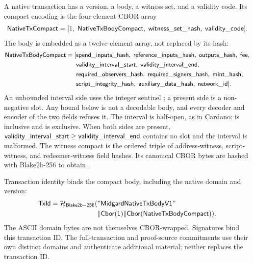 \documentclass[../midgard.tex]{subfiles}
\begin{document}
A native transaction has a version, a body, a witness set, and a validity code.
Its compact encoding is the four-element CBOR array
\begin{equation*}
  \mathsf{NativeTxCompact} =
  [1,\; \mathsf{NativeTxBodyCompact},\; \mathsf{witness\_set\_hash},\; \mathsf{validity\_code}].
\end{equation*}
The body is embedded as a twelve-element array, not replaced by its hash:
\begin{equation*}
\small
\begin{split}
\mathsf{NativeTxBodyCompact} = [&
\mathsf{spend\_inputs\_hash},\;
\mathsf{reference\_inputs\_hash},\;
\mathsf{outputs\_hash},\;
\mathsf{fee},\\
&\mathsf{validity\_interval\_start},\;
\mathsf{validity\_interval\_end},\\
&\mathsf{required\_observers\_hash},\;
\mathsf{required\_signers\_hash},\;
\mathsf{mint\_hash},\\
&\mathsf{script\_integrity\_hash},\;
\mathsf{auxiliary\_data\_hash},\;
\mathsf{network\_id}].
\end{split}
\end{equation*}
An unbounded interval side uses the integer sentinel ; a present side is a non-negative slot.
Any bound below  is not a decodable body, and every decoder and encoder of the two fields refuses it.
The interval is half-open, as in Cardano:  is inclusive and  is exclusive.
When both sides are present, $\mathsf{validity\_interval\_start} \ge \mathsf{validity\_interval\_end}$ contains no slot and the interval is malformed.
The witness compact is the ordered triple of address-witness, script-witness, and redeemer-witness field hashes.
Its canonical CBOR bytes are hashed with Blake2b-256 to obtain .

Transaction identity binds the compact body, including the native domain and version:
\begin{equation*}
\begin{split}
\mathsf{TxId}=\mathcal{H}_{\mathsf{Blake2b-256}}(&
\mathsf{"MidgardNativeTxBodyV1"}\\
&\Vert\mathsf{Cbor(1)}\Vert\mathsf{Cbor(NativeTxBodyCompact)}).
\end{split}
\end{equation*}
The ASCII domain bytes are not themselves CBOR-wrapped.
Signatures bind this transaction ID.
The full-transaction and proof-source commitments use their own distinct domains and authenticate additional material; neither replaces the transaction ID.
\end{document}
